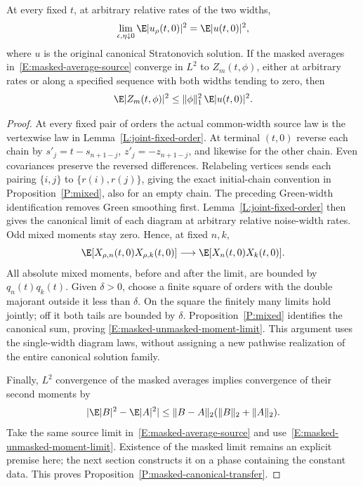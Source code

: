 \begin{proposition}
  \label{P:masked-canonical-transfer}
  At every fixed $t$, at arbitrary relative rates of the two widths,
  \begin{equation}\label{E:masked-unmasked-moment-limit}
    \lim_{\epsilon,\eta\downarrow0}\E|u_\rho(t,0)|^2
    =\E|u(t,0)|^2,
  \end{equation}
  where $u$ is the original canonical Stratonovich solution.
  If the masked averages in~\eqref{E:masked-average-source} converge
  in $L^2$ to $Z_m(t,\phi)$, either at arbitrary rates or along a
  specified sequence with both widths tending to zero, then
  \begin{equation}\label{E:masked-conditional-transfer}
    \E|Z_m(t,\phi)|^2\le\|\phi\|_1^2\,\E|u(t,0)|^2.
  \end{equation}
\end{proposition}

\begin{proof}
  At every fixed pair of orders the actual common-width source law is
  the vertexwise law in Lemma~\ref{L:joint-fixed-order}.
  At terminal $(t,0)$ reverse each chain by
  $s'_j=t-s_{n+1-j}$, $z'_j=-z_{n+1-j}$, and likewise for the
  other chain. Even covariances preserve the reversed differences.
  Relabeling vertices sends each pairing $\{i,j\}$ to
  $\{r(i),r(j)\}$, giving the exact initial-chain convention in
  Proposition~\ref{P:mixed}, also for an empty chain.
  The preceding Green-width identification removes Green smoothing
  first. Lemma~\ref{L:joint-fixed-order} then gives the canonical
  limit of each diagram at arbitrary relative noise-width rates.
  Odd mixed moments stay zero. Hence, at fixed $n,k$,
  \[
    \E[X_{\rho,n}(t,0)X_{\rho,k}(t,0)]
    \longrightarrow \E[X_n(t,0)X_k(t,0)].
  \]
  All absolute mixed moments, before and after the limit, are bounded
  by $q_n(t)q_k(t)$. Given $\delta>0$, choose a finite square of
  orders with the double majorant outside it less than $\delta$.
  On the square the finitely many limits hold jointly; off it both
  tails are bounded by $\delta$. Proposition~\ref{P:mixed}
  identifies the canonical sum, proving
  \eqref{E:masked-unmasked-moment-limit}. This argument uses the
  single-width diagram laws, without assigning a new pathwise
  realization of the entire canonical solution family.

  Finally, $L^2$ convergence of the masked averages implies convergence
  of their second moments by
  \[
    |\E|B|^2-\E|A|^2|
    \le\|B-A\|_2(\|B\|_2+\|A\|_2).
  \]
  Take the same source limit in~\eqref{E:masked-average-source} and
  use~\eqref{E:masked-unmasked-moment-limit}.
  Existence of the masked limit remains an explicit premise here; the
  next section constructs it on a phase containing the constant data.
  This proves Proposition~\ref{P:masked-canonical-transfer}.
\end{proof}
